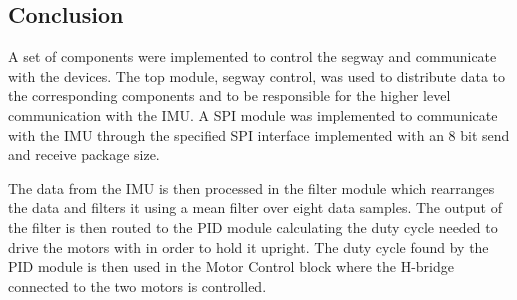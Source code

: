 
\subsection{Conclusion}
A set of components were implemented to control the segway and communicate with the devices.
The top module, segway control, was used to distribute data to the corresponding components and to be responsible for the higher level communication with the IMU.
A SPI module was implemented to communicate with the IMU through the specified SPI interface implemented with an 8 bit send and receive package size.

The data from the IMU is then processed in the filter module which rearranges the data and filters it using a mean filter over eight data samples.
The output of the filter is then routed to the PID module calculating the duty cycle needed to drive the motors with in order to hold it upright.
The duty cycle found by the PID module is then used in the Motor Control block where the H-bridge connected to the two motors is controlled.

